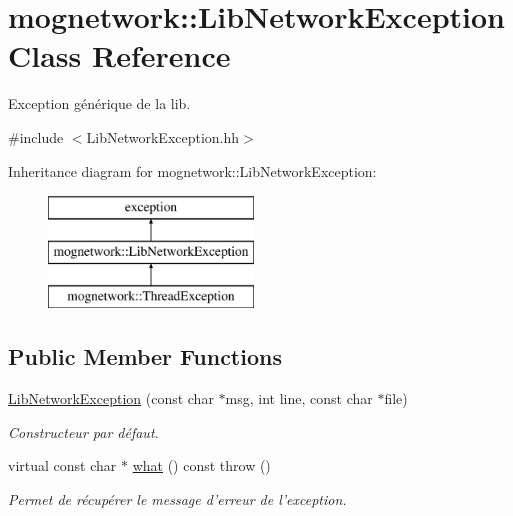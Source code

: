 \hypertarget{classmognetwork_1_1_lib_network_exception}{\section{mognetwork\-:\-:Lib\-Network\-Exception Class Reference}
\label{classmognetwork_1_1_lib_network_exception}
}


Exception générique de la lib.  




{\ttfamily \#include $<$Lib\-Network\-Exception.\-hh$>$}

Inheritance diagram for mognetwork\-:\-:Lib\-Network\-Exception\-:\begin{figure}[H]
\begin{center}
\leavevmode
\includegraphics[height=3.000000cm]{classmognetwork_1_1_lib_network_exception}
\end{center}
\end{figure}
\subsection*{Public Member Functions}
\begin{DoxyCompactItemize}
\item 
\hyperlink{classmognetwork_1_1_lib_network_exception_af74972d2d7160710b8faaccb01f6455c}{Lib\-Network\-Exception} (const char $\ast$msg, int line, const char $\ast$file)
\begin{DoxyCompactList}\small\item\em Constructeur par défaut. \end{DoxyCompactList}\item 
virtual const char $\ast$ \hyperlink{classmognetwork_1_1_lib_network_exception_a65c5c92d2bf25a9c4cd8a0322c36e54a}{what} () const   throw ()
\begin{DoxyCompactList}\small\item\em Permet de récupérer le message d'erreur de l'exception. \end{DoxyCompactList}\end{DoxyCompactItemize}


